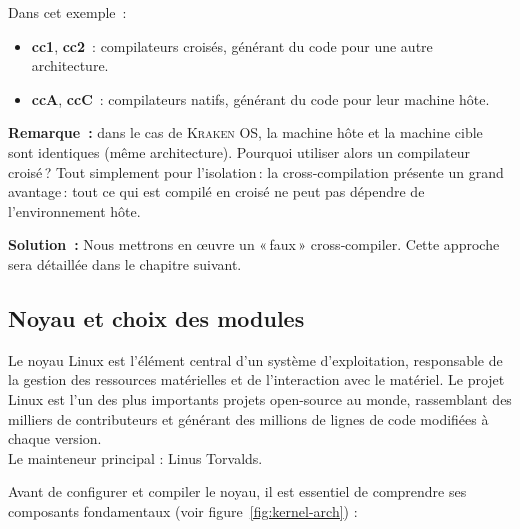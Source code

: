 Dans cet exemple :
\begin{itemize}
  \item \textbf{cc1}, \textbf{cc2} : compilateurs croisés, générant du code pour une autre architecture.
  \item \textbf{ccA}, \textbf{ccC} : compilateurs natifs, générant du code pour leur machine hôte.
\end{itemize}

\bigskip
\noindent
\textbf{Remarque :} dans le cas de \textsc{Kraken OS}, la machine hôte et la machine cible sont identiques (même architecture).  
Pourquoi utiliser alors un compilateur croisé ?  
Tout simplement pour l’isolation : la cross‑compilation présente un grand avantage : tout ce qui est compilé en croisé ne peut pas dépendre de l’environnement hôte.  

\medskip
\noindent
\textbf{Solution :}  
Nous mettrons en œuvre un « faux » cross‑compiler. Cette approche sera détaillée dans le chapitre suivant.


\subsection{Noyau et choix des modules}
\label{subsec:noyau-modules}

Le noyau Linux est l’élément central d’un système d’exploitation, responsable de la gestion des ressources matérielles et de l’interaction avec le matériel. Le projet Linux est l’un des plus importants projets open-source au monde, rassemblant des milliers de contributeurs et générant des millions de lignes de code modifiées à chaque version. \\ 
Le mainteneur principal : Linus Torvalds.


Avant de configurer et compiler le noyau, il est essentiel de comprendre ses composants fondamentaux (voir figure~\ref{fig:kernel-arch}) :

